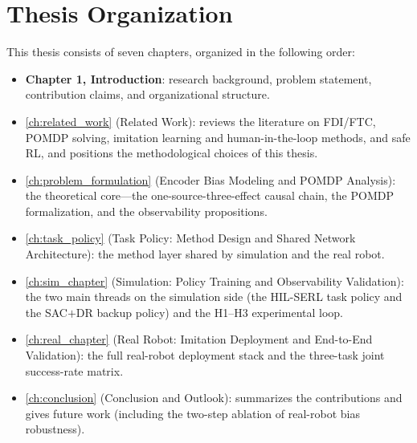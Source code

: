 \section{Thesis Organization}\label{sec:organization}

This thesis consists of seven chapters, organized in the following order:

\begin{itemize}
  \item \textbf{Chapter 1, Introduction}: research background, problem statement, contribution claims, and organizational structure.
  \item \cref{ch:related_work} (Related Work): reviews the literature on FDI/FTC, POMDP solving, imitation learning and human-in-the-loop methods, and safe RL, and positions the methodological choices of this thesis.
  \item \cref{ch:problem_formulation} (Encoder Bias Modeling and POMDP Analysis): the theoretical core---the one-source-three-effect causal chain, the POMDP formalization, and the observability propositions.
  \item \cref{ch:task_policy} (Task Policy: Method Design and Shared Network Architecture): the method layer shared by simulation and the real robot.
  \item \cref{ch:sim_chapter} (Simulation: Policy Training and Observability Validation): the two main threads on the simulation side (the HIL-SERL task policy and the SAC$+$DR backup policy) and the H1--H3 experimental loop.
  \item \cref{ch:real_chapter} (Real Robot: Imitation Deployment and End-to-End Validation): the full real-robot deployment stack and the three-task joint success-rate matrix.
  \item \cref{ch:conclusion} (Conclusion and Outlook): summarizes the contributions and gives future work (including the two-step ablation of real-robot bias robustness).
\end{itemize}
